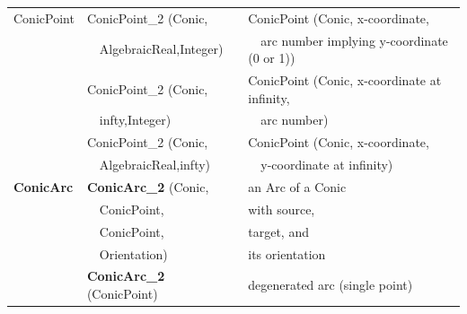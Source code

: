 \begin{ccTexOnly}
\begin{tabular}{*{3}{| l} |}
ConicPoint    & ConicPoint\_2 (Conic,  
                        & ConicPoint (Conic, x-coordinate, \\
              & \ \ AlgebraicReal,Integer)  
                        & \ \ arc number implying y-coordinate (0 or 1)) \\
              & ConicPoint\_2 (Conic,          
                        & ConicPoint (Conic, x-coordinate at infinity, \\
              & \ \ infty,Integer) 
                        & \ \ arc number) \\
              & ConicPoint\_2 (Conic,    
                        & ConicPoint (Conic, x-coordinate, \\
              & \ \ AlgebraicReal,infty) 
                        & \ \ y-coordinate at infinity) \\ \hline



{\bf ConicArc}      & {\bf ConicArc\_2} (Conic,    & an Arc of a Conic \\
              & \ \ ConicPoint,                    & with source,\\
              & \ \ ConicPoint,                    & target, and\\
              & \ \ Orientation)                   & its orientation\\
              & {\bf ConicArc\_2} (ConicPoint)      & degenerated arc (single point) \\ \hline



\end{tabular}
\end{ccTexOnly}
